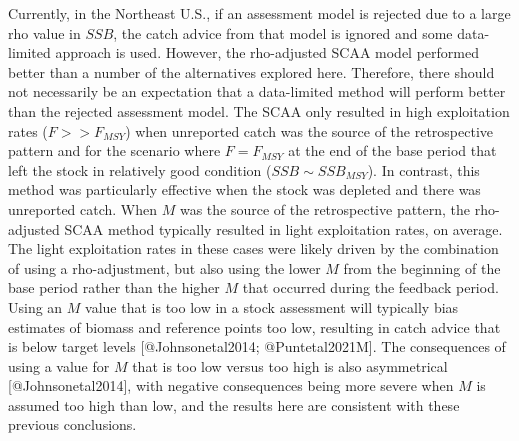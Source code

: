 \documentclass[
  12pt,
]{article}
\begin{document}
Currently, in the Northeast U.S., if an assessment model is rejected due to a large rho value in \(SSB\), the catch advice from that model is ignored and some data-limited approach is used. However, the rho-adjusted SCAA model performed better than a number of the alternatives explored here. Therefore, there should not necessarily be an expectation that a data-limited method will perform better than the rejected assessment model. The SCAA only resulted in high exploitation rates (\(F >> F_{MSY}\)) when unreported catch was the source of the retrospective pattern and for the scenario where \(F=F_{MSY}\) at the end of the base period that left the stock in relatively good condition (\(SSB \sim SSB_{MSY}\)). In contrast, this method was particularly effective when the stock was depleted and there was unreported catch. When \(M\) was the source of the retrospective pattern, the rho-adjusted SCAA method typically resulted in light exploitation rates, on average. The light exploitation rates in these cases were likely driven by the combination of using a rho-adjustment, but also using the lower \(M\) from the beginning of the base period rather than the higher \(M\) that occurred during the feedback period. Using an \(M\) value that is too low in a stock assessment will typically bias estimates of biomass and reference points too low, resulting in catch advice that is below target levels {[}@Johnsonetal2014; @Puntetal2021M{]}. The consequences of using a value for \(M\) that is too low versus too high is also asymmetrical {[}@Johnsonetal2014{]}, with negative consequences being more severe when \(M\) is assumed too high than low, and the results here are consistent with these previous conclusions.
\end{document}
